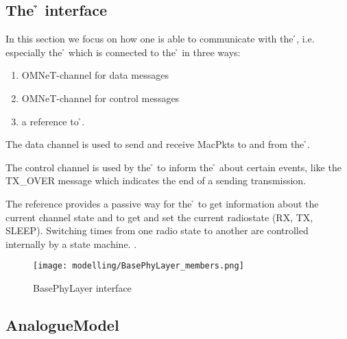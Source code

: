 \subsection{The \h{\bp} interface}

In this section we focus on how one is able to communicate with the 
\h{\bp}, i.e. especially the \h{\bm} which is connected to the \h{\bp}
in three ways:

\begin{enumerate}
 \item OMNeT-channel for data messages
 \item OMNeT-channel for control messages
 \item a reference to \h{\bp}.
\end{enumerate} 

The data channel is used to send and receive MacPkts to and from the \h{\bp}.

The control channel is used by the \h{\bp} to inform the \h{\bm} about
certain events, like the TX\_OVER message 
which indicates the end of a sending transmission.

The reference provides a passive way for the  \h{\bm} to  get information about the current channel state and to get and set the current radiostate (RX, TX, SLEEP).
Switching times from one radio state to another are controlled internally by a state machine. .


\begin{figure}[H]
 \centering
 \texttt{[image: modelling/BasePhyLayer\_members.png]}
 \caption{BasePhyLayer interface}
 \label{fig: BasePhyLayer interface}
\end{figure}



\subsection{AnalogueModel}



